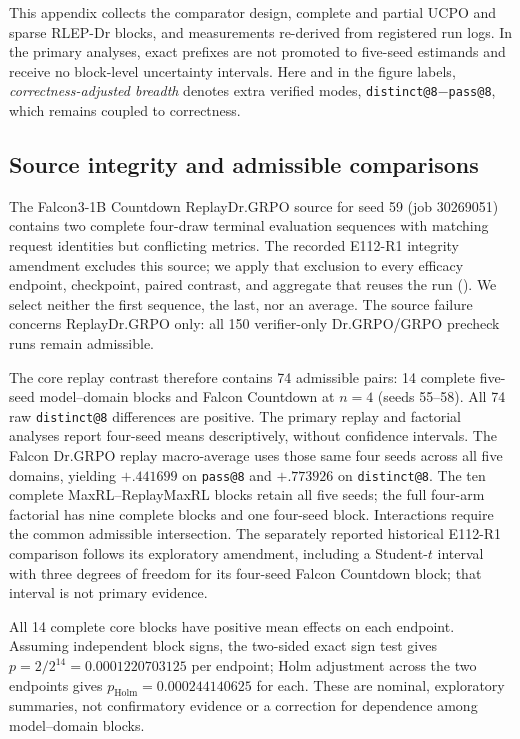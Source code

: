 This appendix collects the comparator design, complete and partial UCPO and
sparse RLEP-Dr blocks, and measurements re-derived from
registered run logs. In the primary analyses, exact prefixes are not promoted
to five-seed estimands and receive no block-level uncertainty intervals. Here and in the figure
labels, \emph{correctness-adjusted breadth} denotes extra verified modes,
\texttt{distinct@8}$-$\texttt{pass@8}, which remains coupled to correctness.

\subsection{Source integrity and admissible comparisons}
\label{app:source-integrity}

The Falcon3-1B Countdown ReplayDr.GRPO source for seed 59 (job 30269051)
contains two complete four-draw terminal evaluation sequences with matching
request identities but conflicting metrics. The recorded E112-R1 integrity
amendment excludes this source; we apply that exclusion to every efficacy
endpoint, checkpoint, paired contrast, and aggregate that reuses the run
().
We select neither the first sequence, the last, nor an average. The source
failure concerns ReplayDr.GRPO only: all 150 verifier-only Dr.GRPO/GRPO
precheck runs remain admissible.

The core replay contrast therefore contains 74 admissible pairs: 14 complete
five-seed model--domain blocks and Falcon Countdown at $n=4$ (seeds 55--58).
All 74 raw \texttt{distinct@8} differences are positive. The primary replay
and factorial analyses report four-seed means descriptively, without
confidence intervals. The Falcon
Dr.GRPO replay macro-average uses those same four seeds across all five
domains, yielding $+.441699$ on \texttt{pass@8} and $+.773926$ on
\texttt{distinct@8}. The ten complete MaxRL--ReplayMaxRL blocks retain all
five seeds; the full four-arm factorial has nine complete blocks and one
four-seed block. Interactions require the common admissible intersection. The separately
reported historical E112-R1 comparison follows its exploratory amendment,
including a Student-$t$ interval with three degrees of freedom for its
four-seed Falcon Countdown block; that interval is not primary evidence.

All 14 complete core blocks have positive mean effects on each endpoint.
Assuming independent block signs, the two-sided exact sign test gives
$p=2/2^{14}=0.0001220703125$ per endpoint; Holm adjustment across the two
endpoints gives $p_{\mathrm{Holm}}=0.000244140625$ for each. These are nominal,
exploratory summaries, not confirmatory evidence or a correction for dependence
among model--domain blocks.

